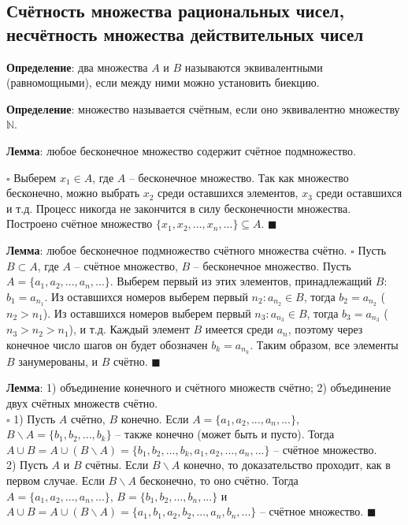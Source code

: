 \documentclass[12pt, a4paper, reqno]{article}
\begin{document}
\subsection{Счётность множества рациональных чисел, несчётность множества действительных чисел}

    \textbf{Определение}: два множества $A$ и $B$ называются эквивалентными (равномощными), если
    между ними можно установить биекцию.

    \textbf{Определение}: множество называется счётным, если оно эквивалентно множеству $\mathbb{N}$.

    \textbf{Лемма}: любое бесконечное множество содержит счётное подмножество.

    $\square$ Выберем $x_1\in A$, где $A$ -- бесконечное множество. Так как множество бесконечно, можно
    выбрать $x_2$ среди оставшихся элементов, $x_3$ среди оставшихся и т.д. Процесс никогда не
    закончится в силу бесконечности множества. Построено счётное множество
    $\{x_1, x_2, ..., x_n, ...\} \subseteq A$. $\blacksquare$

    \textbf{Лемма}: любое бесконечное подмножество счётного множества счётно.
    $\square$ Пусть $B \subset A$, где $A$ -- счётное множество, $B$ -- бесконечное множество. Пусть
    $A = \{a_1, a_2, ..., a_n, ...\}$. Выберем первый из этих элементов, принадлежащий $B$:
    $b_1 = a_{n_1}$. Из оставшихся номеров выберем первый $n_2: a_{n_2} \in B$, тогда $b_2 = a_{n_2}$
    ($n_2 > n_1$). Из оставшихся номеров выберем первый $n_3: a_{n_3} \in B$, тогда $b_3 = a_{n_3}$
    ($n_3 > n_2 > n_1$), и т.д. Каждый элемент $B$ имеется среди $a_n$, поэтому через конечное число
    шагов он будет обозначен $b_k = a_{n_k}$. Таким образом, все элементы $B$ занумерованы, и $B$
    счётно. $\blacksquare$

    \textbf{Лемма}: 1) объединение конечного и счётного множеств счётно; 2) объединение двух счётных
    множеств счётно.\\
    $\square$ 1) Пусть $A$ счётно, $B$ конечно. Если $A = \{a_1, a_2, ..., a_n, ...\}$,
    $B\backslash A = \{b_1, b_2, ..., b_k\}$ -- также конечно (может быть и пусто). Тогда
    $A\cup B = A\cup(B\backslash A) = \{b_1, b_2, ..., b_k, a_1, a_2, ..., a_n, ...\}$ -- счётное
    множество.\\
    2) Пусть $A$ и $B$ счётны. Если $B\backslash A$ конечно, то доказательство проходит, как в первом
    случае. Если $B\backslash A$ бесконечно, то оно счётно. Тогда $A = \{a_1, a_2, ..., a_n, ...\}$,
    $B =  \{b_1, b_2, ..., b_n, ...\}$ и
    $A\cup B = A\cup(B\backslash A) = \{a_1, b_1, a_2, b_2, ..., a_n, b_n, ...\}$ -- счётное
    множество. $\blacksquare$
\end{document}
